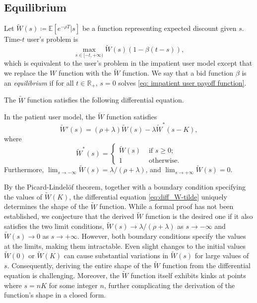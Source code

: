 \documentclass[12pt, letterpaper]{article}
\begin{document}
\subsection{Equilibrium}

Let $\tilde{W}(s) \coloneqq \mathbb{E}[e^{-\rho T}|s]$ be a function representing expected discount given $s$. Time-$t$ user's problem is
\begin{equation}\label{eq: impatient user payoff function}
    \max_{s \in [-t, +\infty)} \tilde{W}(s)(1 - \beta(t - s)),
\end{equation}
which is equivalent to the user's problem in the impatient user model except that we replace the $W$ function with the $\tilde{W}$ function. We say that a bid function $\beta$ is an \emph{equilibrium} if for all $t \in \mathbb{R}_+$, $s = 0$ solves \eqref{eq: impatient user payoff function}.


The $\tilde{W}$ function satisfies the following differential equation.

\begin{thm}\label{thm: differential equation W-tilde satisfies}
    In the patient user model, the $\tilde{W}$ function satisfies
    \begin{equation}\label{eq:diff_W-tilde}
        \tilde{W}'(s) = (\rho + \lambda)\tilde{W}(s) - \lambda \tilde{W}^*(s - K),
    \end{equation}
    where
    \begin{equation}
        \tilde{W}^*(s) = \begin{cases}
            \tilde{W}(s) & \text{ if } s \ge 0;\\
            1 & \text{ otherwise.}
        \end{cases}
    \end{equation}
    Furthermore, $\lim_{s \to - \infty}\tilde{W}(s) = \lambda/(\rho + \lambda)$, and $\lim_{s \to + \infty}\tilde{W}(s) = 0$.
\end{thm}



By the Picard-Lindel\"{o}f theorem, together with a boundary condition specifying the values of $\tilde{W}(K)$, the differential equation \eqref{eq:diff_W-tilde} uniquely determines the shape of the $\tilde{W}$ function. While a formal proof has not been established, we conjecture that the derived $\tilde{W}$ function is the desired one if it also satisfies the two limit conditions, $\tilde{W}(s) \to \lambda/(\rho + \lambda)$ as $s \to - \infty$ and $\tilde{W}(s) \to 0$ as $s \to + \infty$. However, both boundary conditions specify the values at the limits, making them intractable. Even slight changes to the initial values $\tilde{W}(0)$ or $\tilde{W}(K)$ can cause substantial variations in $\tilde{W}(s)$ for large values of $s$. Consequently, deriving the entire shape of the $\tilde{W}$ function from the differential equation is challenging. Moreover, the $\tilde{W}$ function itself exhibits kinks at points where $s = nK$ for some integer $n$, further complicating the derivation of the function's shape in a closed form.
\end{document}
